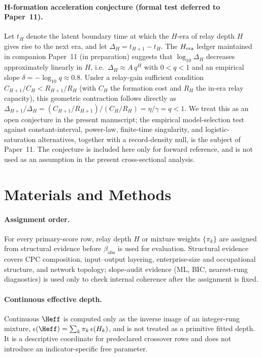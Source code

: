 \paragraph{H-formation acceleration conjecture (formal test deferred to Paper~11).}
Let $t_H$ denote the latent boundary time at which the $H$-era of relay depth $H$ gives rise to the next era, and let $\Delta_H = t_{H+1}-t_H$. The $H_{\rm era}$ ledger maintained in companion Paper~11 (in preparation) suggests that $\log_{10}\Delta_H$ decreases approximately linearly in $H$, i.e.\ $\Delta_H \approx A\,q^H$ with $0<q<1$ and an empirical slope $\delta = -\log_{10}q \approx 0.8$. Under a relay-gain sufficient condition $C_{H+1}/C_H < R_{H+1}/R_H$ (with $C_H$ the formation cost and $R_H$ the in-era relay capacity), this geometric contraction follows directly as $\Delta_{H+1}/\Delta_H = (C_{H+1}/R_{H+1})/(C_H/R_H) = \eta/\gamma = q<1$. We treat this as an open conjecture in the present manuscript; the empirical model-selection test against constant-interval, power-law, finite-time singularity, and logistic-saturation alternatives, together with a record-density null, is the subject of Paper~11. The conjecture is included here only for forward reference, and is not used as an assumption in the present cross-sectional analysis.

\section{Materials and Methods}

\paragraph{Assignment order.}
For every primary-score row, relay depth \(H\) or mixture weights
\(\{\pi_k\}\) are assigned from structural evidence before
\(\beta_{\mathrm{obs}}\) is used for evaluation.  Structural evidence covers
CPC composition, input--output layering, enterprise-size and occupational
structure, and network topology; slope-audit evidence (ML, BIC, nearest-rung
diagnostics) is used only to check internal coherence after the assignment
is fixed.

\paragraph{Continuous effective depth.}
Continuous \(\Heff\) is computed only as the inverse image of an integer-rung
mixture, \(\epsilon(\Heff)=\sum_k\pi_k\,\epsilon(H_k)\), and is not treated
as a primitive fitted depth.  It is a descriptive coordinate for predeclared
crossover rows and does not introduce an indicator-specific free parameter.

